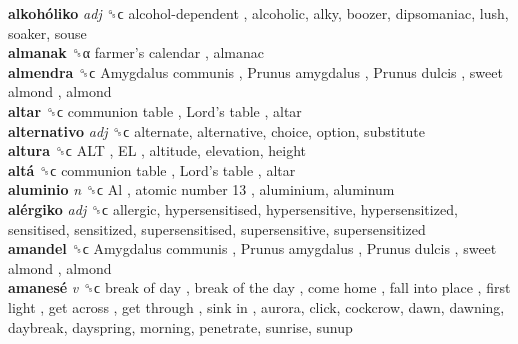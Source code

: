 \textbf{alkohóliko} \emph{adj}  ␝ϲ   alcohol-dependent , alcoholic, alky, boozer, dipsomaniac, lush, soaker, souse  \\
\textbf{almanak} ␝α   farmer’s calendar , almanac  \\
\textbf{almendra} ␝ϲ   Amygdalus communis ,  Prunus amygdalus ,  Prunus dulcis ,  sweet almond , almond  \\
\textbf{altar} ␝ϲ   communion table ,  Lord’s table , altar  \\
\textbf{alternativo} \emph{adj}  ␝ϲ  alternate, alternative, choice, option, substitute  \\
\textbf{altura} ␝ϲ   ALT ,  EL , altitude, elevation, height  \\
\textbf{altá} ␝ϲ   communion table ,  Lord’s table , altar  \\
\textbf{aluminio} \emph{n}  ␝ϲ   Al ,  atomic number 13 , aluminium, aluminum  \\
\textbf{alérgiko} \emph{adj}  ␝ϲ  allergic, hypersensitised, hypersensitive, hypersensitized, sensitised, sensitized, supersensitised, supersensitive, supersensitized  \\
\textbf{amandel} ␝ϲ   Amygdalus communis ,  Prunus amygdalus ,  Prunus dulcis ,  sweet almond , almond  \\
\textbf{amanesé} \emph{v}  ␝ϲ   break of day ,  break of the day ,  come home ,  fall into place ,  first light ,  get across ,  get through ,  sink in , aurora, click, cockcrow, dawn, dawning, daybreak, dayspring, morning, penetrate, sunrise, sunup  \\
